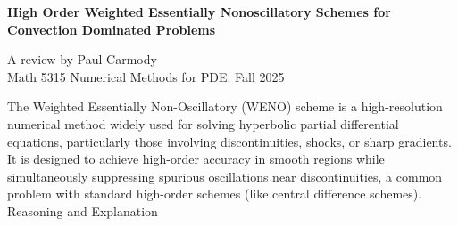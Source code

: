 \documentclass[12pt,a4paper]{article}
\begin{document}
\begin{center}
	\textbf{\Large{High Order Weighted
Essentially Nonoscillatory
Schemes for Convection
Dominated Problems}}
\end{center}
\begin{center}
	A review by Paul Carmody\\Math 5315 Numerical Methods for PDE: Fall 2025
\end{center}

\HLINE
\begin{abstract}
	Provide a synapses and understanding of the article ``High Order Weighted
Essentially Nonoscillatory
Schemes for Convection
Dominated Problems" by Chi-Wang Shu.  The background and motivation for the WENO process is described along with its foundation in ENO (and its limitations).  The WENO methodology is then described in a step by step manner.  We measure than the behavior of the non-linear weights (decribed below).  This article ends with a discussion measuring the merits, advantages and disadvantages of this approach.
\end{abstract}

\HLINE
The Weighted Essentially Non-Oscillatory (WENO) scheme is a high-resolution numerical method widely used for solving hyperbolic partial differential equations, particularly those involving discontinuities, shocks, or sharp gradients. It is designed to achieve high-order accuracy in smooth regions while simultaneously suppressing spurious oscillations near discontinuities, a common problem with standard high-order schemes (like central difference schemes).\\

\noindent Reasoning and Explanation
\end{document}
